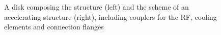  \begin{figure}
 \centering
 \hspace{5mm}
 \caption{A disk composing the structure (left) and the scheme of an accelerating structure (right), including couplers for the RF, cooling elements and connection flanges}
 \label{CLICdisk}
 
 \end{figure}

